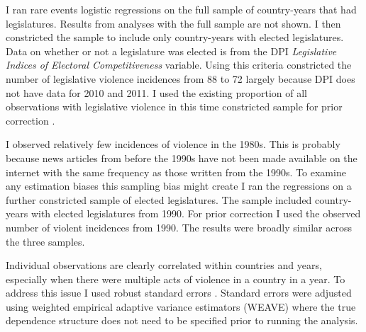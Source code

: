 \documentclass[a4paper]{article}\usepackage{graphicx, color}
\begin{document}
{{I ran rare events logistic regressions on the full sample of country-years that had legislatures. Results from analyses with the full sample are not shown. I then constricted the sample to include only country-years with elected legislatures. Data on whether or not a legislature was elected is from the DPI {\emph{Legislative Indices of Electoral Competitiveness}} variable. Using this criteria constricted the number of legislative violence incidences from 88 to 72 largely because DPI does not have data for 2010 and 2011. I used the existing proportion of all observations with legislative violence in this time constricted sample for prior correction \citep[see][]{KingRareEventsPA2001}. 

I observed relatively few incidences of violence in the 1980s. This is probably because news articles from before the 1990s have not been made available on the internet with the same frequency as those written from the 1990s. To examine any estimation biases this sampling bias might create I ran the regressions on a further constricted sample of elected legislatures. The sample included country-years with elected legislatures from 1990. For prior correction I used the observed number of violent incidences from 1990. The results were broadly similar across the three samples. 

Individual observations are clearly correlated within countries and years, especially when there were multiple acts of violence in a country in a year. To address this issue I used robust standard errors \citep{Golder2006, Mainwaring2007}. Standard errors were adjusted using \cite{Lumley1999} weighted empirical adaptive variance estimators (WEAVE) where the true dependence structure does not need to be specified prior to running the analysis. 

}}
\end{document}
